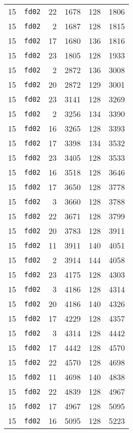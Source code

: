 \documentclass{article}
\begin{document}
\begin{table}[h!]
\begin{tabular}{llrrrl}
    15 & \texttt{fd02} & 22 & 1678 & 128 & 1806 \\
    15 & \texttt{fd02} & 2 & 1687 & 128 & 1815 \\
    15 & \texttt{fd02} & 17 & 1680 & 136 & 1816 \\
    15 & \texttt{fd02} & 23 & 1805 & 128 & 1933 \\
    15 & \texttt{fd02} & 2 & 2872 & 136 & 3008 \\
    15 & \texttt{fd02} & 20 & 2872 & 129 & 3001 \\
    15 & \texttt{fd02} & 23 & 3141 & 128 & 3269 \\
    15 & \texttt{fd02} & 2 & 3256 & 134 & 3390 \\
    15 & \texttt{fd02} & 16 & 3265 & 128 & 3393 \\
    15 & \texttt{fd02} & 17 & 3398 & 134 & 3532 \\
    15 & \texttt{fd02} & 23 & 3405 & 128 & 3533 \\
    15 & \texttt{fd02} & 16 & 3518 & 128 & 3646 \\
    15 & \texttt{fd02} & 17 & 3650 & 128 & 3778 \\
    15 & \texttt{fd02} & 3 & 3660 & 128 & 3788 \\
    15 & \texttt{fd02} & 22 & 3671 & 128 & 3799 \\
    15 & \texttt{fd02} & 20 & 3783 & 128 & 3911 \\
    15 & \texttt{fd02} & 11 & 3911 & 140 & 4051 \\
    15 & \texttt{fd02} & 2 & 3914 & 144 & 4058 \\
    15 & \texttt{fd02} & 23 & 4175 & 128 & 4303 \\
    15 & \texttt{fd02} & 3 & 4186 & 128 & 4314 \\
    15 & \texttt{fd02} & 20 & 4186 & 140 & 4326 \\
    15 & \texttt{fd02} & 17 & 4229 & 128 & 4357 \\
    15 & \texttt{fd02} & 3 & 4314 & 128 & 4442 \\
    15 & \texttt{fd02} & 17 & 4442 & 128 & 4570 \\
    15 & \texttt{fd02} & 22 & 4570 & 128 & 4698 \\
    15 & \texttt{fd02} & 11 & 4698 & 140 & 4838 \\
    15 & \texttt{fd02} & 22 & 4839 & 128 & 4967 \\
    15 & \texttt{fd02} & 17 & 4967 & 128 & 5095 \\
    15 & \texttt{fd02} & 16 & 5095 & 128 & 5223 \\

\end{tabular}
\end{table}
\end{document}
